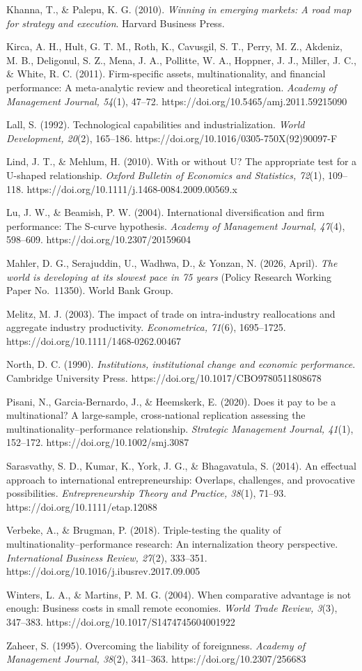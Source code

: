 \documentclass[
  12pt,a4paper]{article}
\begin{document}
Khanna, T., \& Palepu, K. G. (2010). \emph{Winning in emerging markets:
A road map for strategy and execution}. Harvard Business Press.

Kirca, A. H., Hult, G. T. M., Roth, K., Cavusgil, S. T., Perry, M. Z.,
Akdeniz, M. B., Deligonul, S. Z., Mena, J. A., Pollitte, W. A., Hoppner,
J. J., Miller, J. C., \& White, R. C. (2011). Firm-specific assets,
multinationality, and financial performance: A meta-analytic review and
theoretical integration. \emph{Academy of Management Journal, 54}(1),
47--72. https://doi.org/10.5465/amj.2011.59215090

Lall, S. (1992). Technological capabilities and industrialization.
\emph{World Development, 20}(2), 165--186.
https://doi.org/10.1016/0305-750X(92)90097-F

Lind, J. T., \& Mehlum, H. (2010). With or without U? The appropriate
test for a U-shaped relationship. \emph{Oxford Bulletin of Economics and
Statistics, 72}(1), 109--118.
https://doi.org/10.1111/j.1468-0084.2009.00569.x

Lu, J. W., \& Beamish, P. W. (2004). International diversification and
firm performance: The S-curve hypothesis. \emph{Academy of Management
Journal, 47}(4), 598--609. https://doi.org/10.2307/20159604

Mahler, D. G., Serajuddin, U., Wadhwa, D., \& Yonzan, N. (2026, April).
\emph{The world is developing at its slowest pace in 75 years} (Policy
Research Working Paper No.~11350). World Bank Group.

Melitz, M. J. (2003). The impact of trade on intra-industry
reallocations and aggregate industry productivity. \emph{Econometrica,
71}(6), 1695--1725. https://doi.org/10.1111/1468-0262.00467

North, D. C. (1990). \emph{Institutions, institutional change and
economic performance}. Cambridge University Press.
https://doi.org/10.1017/CBO9780511808678

Pisani, N., Garcia-Bernardo, J., \& Heemskerk, E. (2020). Does it pay to
be a multinational? A large-sample, cross-national replication assessing
the multinationality--performance relationship. \emph{Strategic
Management Journal, 41}(1), 152--172. https://doi.org/10.1002/smj.3087

Sarasvathy, S. D., Kumar, K., York, J. G., \& Bhagavatula, S. (2014). An
effectual approach to international entrepreneurship: Overlaps,
challenges, and provocative possibilities. \emph{Entrepreneurship Theory
and Practice, 38}(1), 71--93. https://doi.org/10.1111/etap.12088

Verbeke, A., \& Brugman, P. (2018). Triple-testing the quality of
multinationality--performance research: An internalization theory
perspective. \emph{International Business Review, 27}(2), 333--351.
https://doi.org/10.1016/j.ibusrev.2017.09.005

Winters, L. A., \& Martins, P. M. G. (2004). When comparative advantage
is not enough: Business costs in small remote economies. \emph{World
Trade Review, 3}(3), 347--383. https://doi.org/10.1017/S1474745604001922

Zaheer, S. (1995). Overcoming the liability of foreignness.
\emph{Academy of Management Journal, 38}(2), 341--363.
https://doi.org/10.2307/256683
\end{document}
